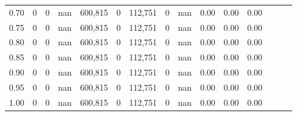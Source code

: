 \begin{tabular}{rrrrrrrrrrrrrrr}
0.70 &        0 &       0 &   nan &  600,815 &        0 &  112,751 &        0 &   nan &  0.00 &  0.00 &      0.00 \\
0.75 &        0 &       0 &   nan &  600,815 &        0 &  112,751 &        0 &   nan &  0.00 &  0.00 &      0.00 \\
0.80 &        0 &       0 &   nan &  600,815 &        0 &  112,751 &        0 &   nan &  0.00 &  0.00 &      0.00 \\
0.85 &        0 &       0 &   nan &  600,815 &        0 &  112,751 &        0 &   nan &  0.00 &  0.00 &      0.00 \\
0.90 &        0 &       0 &   nan &  600,815 &        0 &  112,751 &        0 &   nan &  0.00 &  0.00 &      0.00 \\
0.95 &        0 &       0 &   nan &  600,815 &        0 &  112,751 &        0 &   nan &  0.00 &  0.00 &      0.00 \\
1.00 &        0 &       0 &   nan &  600,815 &        0 &  112,751 &        0 &   nan &  0.00 &  0.00 &      0.00 \\
\bottomrule
\end{tabular}
